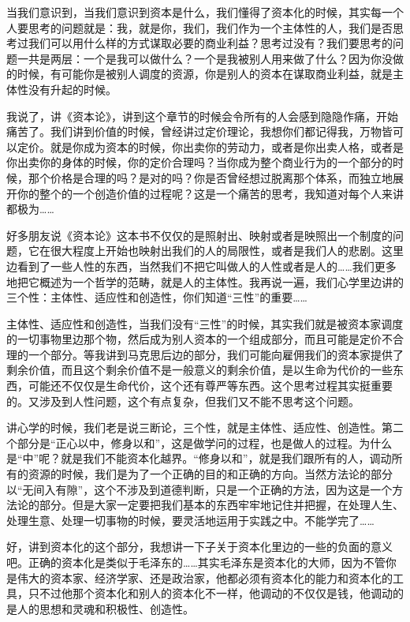 \documentclass[UTF8, 12pt, a4paper]{ctexrep}
\begin{document}
当我们意识到，当我们意识到资本是什么，我们懂得了资本化的时候，其实每一个人要思考的问题就是：我，就是你，我们，我们作为一个主体性的人，我们是否思考过我们可以用什么样的方式谋取必要的商业利益？思考过没有？我们要思考的问题一共是两层：一个是我可以做什么？一个是我被别人用来做了什么？因为你没做的时候，有可能你是被别人调度的资源，你是别人的资本在谋取商业利益，就是主体性没有升起的时候。

我说了，讲《资本论》，讲到这个章节的时候会令所有的人会感到隐隐作痛，开始痛苦了。我们讲到价值的时候，曾经讲过定价理论，我想你们都记得我，万物皆可以定价。就是你成为资本的时候，你出卖你的劳动力，或者是你出卖人格，或者是你出卖你的身体的时候，你的定价合理吗？当你成为整个商业行为的一个部分的时候，那个价格是合理的吗？是对的吗？你是否曾经想过脱离那个体系，而独立地展开你的整个的一个创造价值的过程呢？这是一个痛苦的思考，我知道对每个人来讲都极为……

好多朋友说《资本论》这本书不仅仅的是照射出、映射或者是映照出一个制度的问题，它在很大程度上开始也映射出我们的人的局限性，或者是我们人的悲剧。这里边看到了一些人性的东西，当然我们不把它叫做人的人性或者是人的……我们更多地把它概述为一个哲学的范畴，就是人的主体性。我再说一遍，我们心学里边讲的三个性：主体性、适应性和创造性，你们知道“三性”的重要……

主体性、适应性和创造性，当我们没有“三性”的时候，其实我们就是被资本家调度的一切事物里边那个物，然后成为别人资本的一个组成部分，而且可能是定价不合理的一个部分。等我讲到马克思后边的部分，我们可能向雇佣我们的资本家提供了剩余价值，而且这个剩余价值不是一般意义的剩余价值，是以生命为代价的一些东西，可能还不仅仅是生命代价，这个还有尊严等东西。这个思考过程其实挺重要的。又涉及到人性问题，这个有点复杂，但我们又不能不思考这个问题。

讲心学的时候，我们老是说三断论，三个性，就是主体性、适应性、创造性。第二个部分是“正心以中，修身以和”，这是做学问的过程，也是做人的过程。为什么是“中”呢？就是我们不能资本化越界。“修身以和”，就是我们跟所有的人，调动所有的资源的时候，我们是为了一个正确的目的和正确的方向。当然方法论的部分以“无间入有隙”，这个不涉及到道德判断，只是一个正确的方法，因为这是一个方法论的部分。但是大家一定要把我们基本的东西牢牢地记住并把握，在处理人生、处理生意、处理一切事物的时候，要灵活地运用于实践之中。不能学完了……

好，讲到资本化的这个部分，我想讲一下子关于资本化里边的一些的负面的意义吧。正确的资本化是类似于毛泽东的……其实毛泽东是资本化的大师，因为不管你是伟大的资本家、经济学家、还是政治家，他都必须有资本化的能力和资本化的工具，只不过他那个资本化和别人的资本化不一样，他调动的不仅仅是钱，他调动的是人的思想和灵魂和积极性、创造性。
\end{document}
